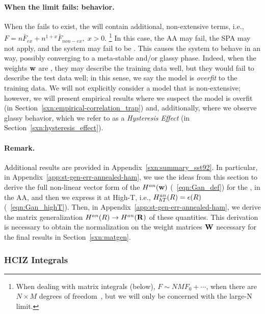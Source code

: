 {\paragraph{When the limit fails: \ATypical behavior.}
When the \ThermodynamicLimit fails to exist, the \FreeEnergy will contain additional, non-extensive terms, i.e.,
$F = n\bar{F}_{ex} + n^{1+x}\bar{F}_{non-ex},\;x>0$.
\footnote{When dealing with matrix integrals (below), $F\sim NMF_{0}+\cdots$, when there are $N \times M$ degrees
of freedom~\cite{PP95}, but we will only be concerned with the large-N limit.}
In this case, the AA may fail, the SPA may not apply, and the system may fail to be \SelfAveraging.
This causes the system to behave in an \ATypical way, 
possibly converging to a meta-stable and/or glassy phase.
Indeed, when the weights ${\mathbf{w}}$ are \emph{\ATypical}, they may describe the training data well, 
but they would fail to describe the test data well; in this sense, we say the model is \emph{overfit} to the training data.
We will not explicitly consider a model that is non-extensive; however, we will
present empirical results where we suspect the model is overfit
(in Section~\ref{sxn:empirical-correlation_trap})
and, additionally, where we observe glassy behavior, which we refer to as a \emph{Hysteresis Effect}
(in Section~\ref{sxn:hysteresis_effect}).



\paragraph{Remark.} 
Additional results are provided in Appendix~\ref{sxn:summary_sst92}.
In particular, in Appendix~\ref{app:st-gen-err-annealed-ham}, we use the ideas from this section to derive the full non-linear vector form of the \AnnealedHamiltonian $H^{an}({\mathbf{w}})$ (\EQN~\ref{eqn:Gan_def})
for the \LinearPerceptron, in the AA, and then we express it at High-T, i.e.,
$H^{an}_{hT}(R)=\epsilon(R)$ (\EQN~\ref{eqn:Gan_highT}).  
Then, in Appendix~\ref{app:st-gen-err-annealed-ham}, we derive the matrix generalization
$H^{an}(R)\rightarrow H^{an}(\mathbf{R})$ of these quantities.
This derivation is necessary to obtain the normalization on the weight matrices ${\mathbf{W}}$ necessary for the final results in Section~\ref{sxn:matgen}.


\subsubsection{HCIZ Integrals}
\label{sxn:mathP_hciz}

}
